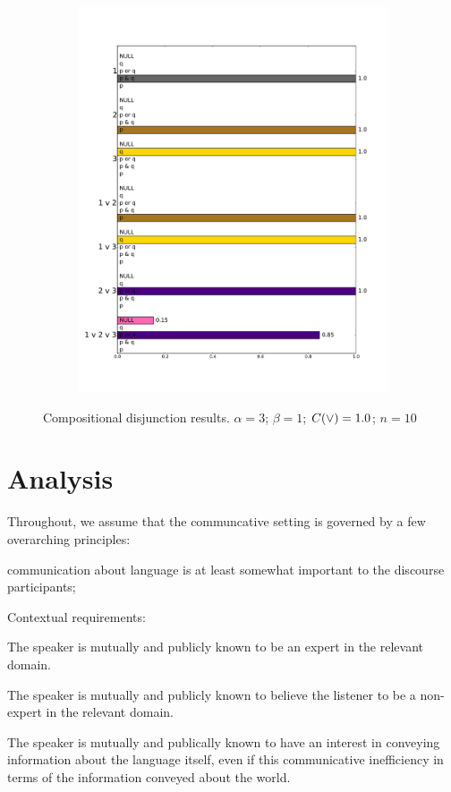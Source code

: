 \documentclass{article}
\begin{document}
\begin{figure}[tp]
\begin{subfigure}{0.48\textwidth}
    \includegraphics[width=1\textwidth]{fig/scalardisj-expertise-speaker-lexsum}
  \end{subfigure}
  \caption{Compositional disjunction results. $\alpha = 3$; $\beta = 1$; $C(\vee) = 1.0$; $n = 10$}
  \label{fig:compdisj}
\end{figure}



\section{Analysis}\label{sec:analysis}


Throughout, we
assume that the communcative setting is governed by a few overarching
principles: 

 communication about language is at least somewhat
important to the discourse participants; 

Contextual requirements: 

\begin{examples}
\item The speaker is mutually and publicly known to be an expert in
  the relevant domain.
  
\item The speaker is mutually and publicly known to believe the
  listener to be a non-expert in the relevant domain.
  
\item The speaker is mutually and publically known to have an
  interest in conveying information about the language itself,
  even if this communicative inefficiency in terms of the 
  information conveyed about the world.
\end{examples}
\end{document}
